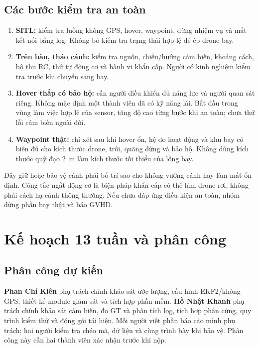 \documentclass[a4paper,12pt]{article}
\begin{document}
\subsection{Các bước kiểm tra an toàn}
\begin{enumerate}
\item \textbf{SITL:} kiểm tra luồng không GPS, hover, waypoint, dừng nhiệm vụ và mất kết nối bằng log. Không bỏ kiểm tra trạng thái hợp lệ để ép drone bay.
\item \textbf{Trên bàn, tháo cánh:} kiểm tra nguồn, chiều/hướng cảm biến, khoảng cách, bộ thu RC, thứ tự động cơ và hành vi khẩn cấp. Người có kinh nghiệm kiểm tra trước khi chuyển sang bay.
\item \textbf{Hover thấp có bảo hộ:} cần người điều khiển đủ năng lực và người quan sát riêng. Không mặc định một thành viên đã có kỹ năng lái. Bắt đầu trong vùng làm việc hợp lệ của sensor, tăng độ cao từng bước khi an toàn; chưa thử lỗi cảm biến ngoài đời.
\item \textbf{Waypoint thật:} chỉ xét sau khi hover ổn, hệ đo hoạt động và khu bay có biên đủ cho kích thước drone, trôi, quãng dừng và bảo hộ. Không dùng kích thước quỹ đạo 2~m làm kích thước tối thiểu của lồng bay.
\end{enumerate}
Dây giữ hoặc bảo vệ cánh phải bố trí sao cho không vướng cánh hay làm mất ổn định. Công tắc ngắt động cơ là biện pháp khẩn cấp có thể làm drone rơi, không phải cách hạ cánh thông thường. Nếu chưa đáp ứng điều kiện an toàn, nhóm dừng phần bay thật và báo GVHD.

\section{Kế hoạch 13 tuần và phân công}
\subsection{Phân công dự kiến}
\textbf{Phan Chí Kiên} phụ trách chính khảo sát ước lượng, cấu hình EKF2/không GPS, thiết kế module giám sát và tích hợp phần mềm. \textbf{Hồ Nhật Khanh} phụ trách chính khảo sát cảm biến, đo GT và phân tích log, tích hợp phần cứng, quy trình kiểm thử và đóng gói tái hiện. Mỗi người viết phần báo cáo mình phụ trách; hai người kiểm tra chéo mã, dữ liệu và cùng trình bày khi bảo vệ. Phân công này cần hai thành viên xác nhận trước khi nộp.
\end{document}
